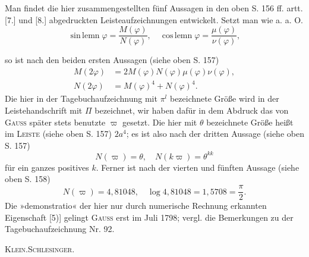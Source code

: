 \medskip\begingroup\small
\indent Man findet die hier zusammengestellten fünf Aussagen in den oben S. 156 ff. artt. [7.] und [8.] abgedruckten Leisteaufzeichnungen entwickelt. Setzt man wie a. a. O.
\[
\operatorname{sin\,lemn}\varphi=\frac{M(\varphi)}{N(\varphi)},\quad\operatorname{cos\,lemn}\varphi=\frac{\mu(\varphi)}{\nu(\varphi)},
\]
\par\endgroup

\clearpage{}
\begingroup\small
\noindent so ist nach den beiden ersten Aussagen (siehe oben S. 157)
\[
\begin{aligned}
M(2\varphi)&=2M(\varphi)N(\varphi)\mu(\varphi)\nu(\varphi),\\
N(2\varphi)&=M(\varphi)^4+N(\varphi)^4.
\end{aligned}
\]
\indent Die hier in der Tagebuchaufzeichnung mit \(\pi^l\) bezeichnete Größe wird in der Leistehandschrift mit \(\Pi\) bezeichnet, wir haben dafür in dem Abdruck das von \textsc{Gauss} später stets benutzte \(\varpi\) gesetzt. Die hier mit \(\theta\) bezeichnete Größe heißt im \textsc{Leiste} (siehe oben S. 157) \(2a^4\); es ist also nach der dritten Aussage (siehe oben S. 157)
\[
N(\varpi)=\theta,\quad N(k\varpi)=\theta^{kk}
\]
\noindent für ein ganzes positives \(k\). Ferner ist nach der vierten und fünften Aussage (siehe oben S. 158)
\[
N(\varpi)=4{,}81048,\quad\log4{,}81048=1{,}5708=\frac\pi2.
\]
\noindent Die »demonstratio« der hier nur durch numerische Rechnung erkannten Eigenschaft [5)] gelingt \textsc{Gauss} erst im Juli 1798; vergl. die Bemerkungen zu der Tagebuchaufzeichnung Nr. 92.
\par\noindent\hfill\textsc{Klein.\quad Schlesinger.}
\par\endgroup
